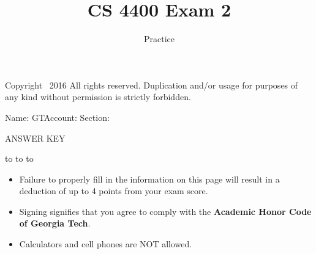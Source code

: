 \documentclass[answers,10pt,a4paper]{exam}
\title{CS 4400 Exam 2}
\date{Practice}
\begin{document}
\maketitle
\thispagestyle{empty}
\firstpageheader{}               {\tiny Copyright \textcopyright\ 2016 All rights reserved. Duplication and/or usage for purposes of any kind without permission is strictly forbidden.}
                {}


\runningheader{}
{\small Name: \underline{\hspace{2.8in}} GTAccount: \underline{\hspace{1.4in}} Section: \underline{\hspace{.5in}}}
{}



\ifprintanswers
\begin{center}
{\LARGE ANSWER KEY}
\end{center}
\vspace{.25in}
\else
\vspace{0.1in}
\hbox to \textwidth{Name: \enspace\hrulefill}
\vspace{0.2in}
\hbox to 
\vspace{0.2in}
\hbox to \textwidth{Signature: \enspace\hrulefill}

\vfill

\begin{itemize}
\item Failure to properly fill in the information on this page will result in a deduction of up to 4 points from your exam score.
\item Signing signifies that you agree to comply with the {\bf Academic Honor Code of Georgia Tech}.
\item Calculators and cell phones are NOT allowed.
\end{itemize}

\fi


\end{document}

